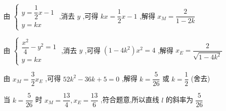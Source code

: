\begin{enumerate}
\begin{enumerate}
\begin{jieda}
\begin{enumerate}
                由 $\left\{  \begin{array}{l} y = \dfrac{1}{2}x - 1 \\  y = {kx} \end{array}\right.$ ,消去 $y$ ,可得 ${kx} = \dfrac{1}{2}x - 1$ ,解得 ${x}_M = \dfrac{2}{1 - {2k}}$

                由 $\left\{  \begin{matrix} \dfrac{{x}^{2}}{4} - {y}^{2} = 1 \\  y = {kx} \end{matrix}\right.$ ,消去 $y$ ,可得 $\left( {1 - 4{k}^{2}}\right) {x}^{2} = 4$ ,解得 ${x}_E = \dfrac{2}{\sqrt{1 - 4{k}^{2}}}$

                由 ${x}_M = \dfrac{3}{2}{x}_E$ ,可得 ${52}{k}^{2} - {36k} + 5 = 0$ ,解得 $k = \dfrac{5}{26}$ 或 $k = \dfrac{1}{2}$ (舍去)

                当 $k = \dfrac{5}{26}$ 时 ${x}_M = \dfrac{13}{4},{x}_E = \dfrac{13}{6}$ ,符合题意,所以直线 $l$ 的斜率为 $\dfrac{5}{26}$
            \end{enumerate}
        \end{jieda}



\end{enumerate}
\end{enumerate}
